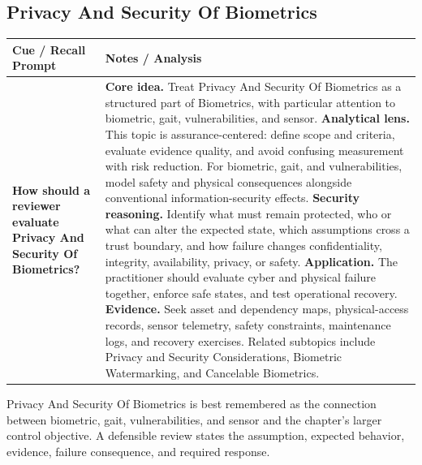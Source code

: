 \documentclass[11pt]{article}
\newcommand{\CornellHeader}{%
\rowcolor{Navy}\color{white}\bfseries Cue / Recall Prompt & \color{white}\bfseries Notes / Analysis\\\hline}
\newcommand{\CornellRow}[2]{%
\cellcolor{CueGray}\RaggedRight\textbf{#1} & \RaggedRight #2\\\hline}
\begin{document}
\subsection*{Privacy And Security Of Biometrics}
\begin{longtable}{>{\RaggedRight\arraybackslash}p{}|>{\RaggedRight\arraybackslash}p{}}
\CornellHeader
\CornellRow{How should a reviewer evaluate Privacy And Security Of Biometrics?}{\textbf{Core idea.} Treat Privacy And Security Of Biometrics as a structured part of Biometrics, with particular attention to biometric, gait, vulnerabilities, and sensor. \textbf{Analytical lens.} This topic is assurance-centered: define scope and criteria, evaluate evidence quality, and avoid confusing measurement with risk reduction. For biometric, gait, and vulnerabilities, model safety and physical consequences alongside conventional information-security effects. \textbf{Security reasoning.} Identify what must remain protected, who or what can alter the expected state, which assumptions cross a trust boundary, and how failure changes confidentiality, integrity, availability, privacy, or safety. \textbf{Application.} The practitioner should evaluate cyber and physical failure together, enforce safe states, and test operational recovery. \textbf{Evidence.} Seek asset and dependency maps, physical-access records, sensor telemetry, safety constraints, maintenance logs, and recovery exercises. Related subtopics include Privacy and Security Considerations, Biometric Watermarking, and Cancelable Biometrics.}
\end{longtable}
\begin{topicsummary}
Privacy And Security Of Biometrics is best remembered as the connection between biometric, gait, vulnerabilities, and sensor and the chapter's larger control objective. A defensible review states the assumption, expected behavior, evidence, failure consequence, and required response.
\end{topicsummary}
\end{document}
